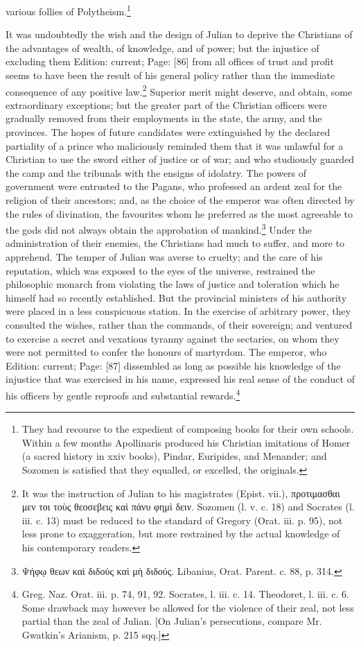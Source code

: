 various follies of Polytheism.\footnote{They had recourse to the expedient of composing books for their own schools. Within a few months Apollinaris produced his Christian imitations of Homer (a sacred history in xxiv books), Pindar, Euripides, and Menander; and Sozomen is satisfied that they equalled, or excelled, the originals.}

It was undoubtedly the wish and the design of Julian to deprive the Christians of the advantages of wealth, of knowledge, and of power; but the injustice of excluding them Edition: current; Page: [86] from all offices of trust and profit seems to have been the result of his general policy rather than the immediate consequence of any positive law.\footnote{It was the instruction of Julian to his magistrates (Epist. vii.), \textgreek{προτιμασθαι μεν τοι το\texthebrew{ὺ}ς θεοσεβεις κα\texthebrew{ὶ} πάνυ φημ\texthebrew{ὶ} δειν}. Sozomen (l. v. c. 18) and Socrates (l. iii. c. 13) must be reduced to the standard of Gregory (Orat. iii. p. 95), not less prone to exaggeration, but more restrained by the actual knowledge of his contemporary readers.} Superior merit might deserve, and obtain, some extraordinary exceptions; but the greater part of the Christian officers were gradually removed from their employments in the state, the army, and the provinces. The hopes of future candidates were extinguished by the declared partiality of a prince who maliciously reminded them that it was unlawful for a Christian to use the sword either of justice or of war; and who studiously guarded the camp and the tribunals with the ensigns of idolatry. The powers of government were entrusted to the Pagans, who professed an ardent zeal for the religion of their ancestors; and, as the choice of the emperor was often directed by the rules of divination, the favourites whom he preferred as the most agreeable to the gods did not always obtain the approbation of mankind.\footnote{\textgreek{Ψήφ\texthebrew{ῳ} θεων κα\texthebrew{ὶ} διδο\texthebrew{ὐ}ς κα\texthebrew{ὶ} μ\texthebrew{ὴ} διδούς}. Libanius, Orat. Parent. c. 88, p. 314.} Under the administration of their enemies, the Christians had much to suffer, and more to apprehend. The temper of Julian was averse to cruelty; and the care of his reputation, which was exposed to the eyes of the universe, restrained the philosophic monarch from violating the laws of justice and toleration which he himself had so recently established. But the provincial ministers of his authority were placed in a less conspicuous station. In the exercise of arbitrary power, they consulted the wishes, rather than the commands, of their sovereign; and ventured to exercise a secret and vexatious tyranny against the sectaries, on whom they were not permitted to confer the honours of martyrdom. The emperor, who Edition: current; Page: [87] dissembled as long as possible his knowledge of the injustice that was exercised in his name, expressed his real sense of the conduct of his officers by gentle reproofs and substantial rewards.\footnote{Greg. Naz. Orat. iii. p. 74, 91, 92. Socrates, l. iii. c. 14. Theodoret, l. iii. c. 6. Some drawback may however be allowed for the violence of their zeal, not less partial than the zeal of Julian. [On Julian\texthebrew{}’s persecutions, compare Mr. Gwatkin\texthebrew{}’s Arianism, p. 215 sqq.]}

